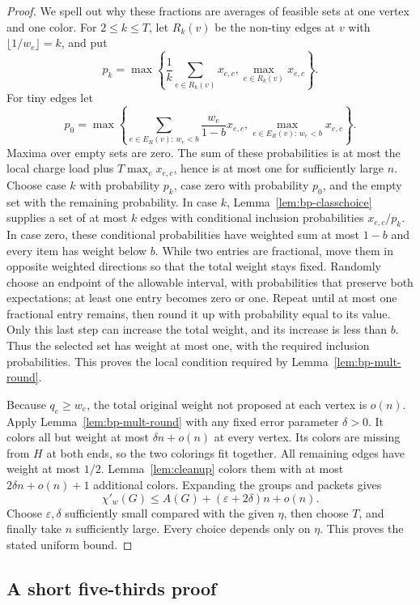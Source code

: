 \documentclass[11pt]{article}
\theoremstyle{definition}\newtheorem{algorithm}{Algorithm}[section]
\numberwithin{equation}{section}
\theoremstyle{remark}\newtheorem*{remark}{Remark}
\begin{document}
\begin{proof}
We spell out why these fractions are averages of feasible sets at
one vertex and one color. For $2\le k\le T$, let $R_k(v)$ be the
non-tiny edges at $v$ with $\lfloor1/w_e\rfloor=k$, and put
\[
 p_k=\max\left\{\frac1k\sum_{e\in R_k(v)}x_{e,c},
                             \max_{e\in R_k(v)}x_{e,c}\right\}.
\]
For tiny edges let
\[
 p_0=\max\left\{\sum_{e\in E_R(v):\,w_e<b}\frac{w_e}{1-b}x_{e,c},
                             \max_{e\in E_R(v):\,w_e<b}x_{e,c}\right\}.
\]
Maxima over empty sets are zero. The sum of these probabilities is at
most the local charge load plus $T\max_e x_{e,c}$, hence is at most one
for sufficiently large $n$.
Choose case $k$ with probability $p_k$, case zero with probability
$p_0$, and the empty set with the remaining probability.
In case $k$, Lemma~\ref{lem:bp-classchoice} supplies a set of at most $k$
edges with conditional inclusion probabilities $x_{e,c}/p_k$.
In case zero, these conditional probabilities have weighted sum at most
$1-b$ and every item has weight below $b$. While two entries are fractional, move them in opposite weighted
directions so that the total weight stays fixed. Randomly choose an
endpoint of the allowable interval, with probabilities that preserve
both expectations; at least one entry becomes zero or one. Repeat
until at most one fractional entry remains, then round it up with
probability equal to its value. Only this last step can increase the
total weight, and its increase is less than $b$. Thus the selected
set has weight at most one, with the required inclusion probabilities. This proves the local condition
required by Lemma~\ref{lem:bp-mult-round}.

Because $q_e\ge w_e$, the total original weight not proposed at each
vertex is $o(n)$. Apply Lemma~\ref{lem:bp-mult-round} with any fixed
error parameter $\delta>0$. It colors all but weight at most
$\delta n+o(n)$ at every vertex. Its colors are missing from $H$ at both
ends, so the two colorings fit together.
All remaining edges have weight at most $1/2$.
Lemma~\ref{lem:cleanup} colors them with at most
$2\delta n+o(n)+1$ additional colors.
Expanding the groups and packets gives
\[
 \chi'_w(G)\le A(G)+(\varepsilon+2\delta)n+o(n).
\]
Choose $\varepsilon,\delta$ sufficiently small compared with the given
$\eta$, then choose $T$, and finally take $n$ sufficiently large.
Every choice depends only on $\eta$. This proves the stated uniform bound.
\end{proof}


\subsection{A short five-thirds proof}\label{sec:short-five-thirds}
\end{document}
